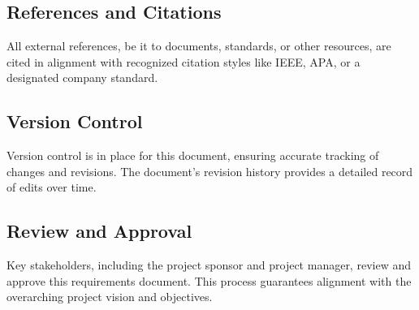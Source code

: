 \subsection{References and Citations}
All external references, be it to documents, standards, or other resources, are cited in alignment with recognized citation styles like IEEE, APA, or a designated company standard.

\subsection{Version Control}
Version control is in place for this document, ensuring accurate tracking of changes and revisions. The document's revision history provides a detailed record of edits over time.

\subsection{Review and Approval}
Key stakeholders, including the project sponsor and project manager, review and approve this requirements document. This process guarantees alignment with the overarching project vision and objectives.
